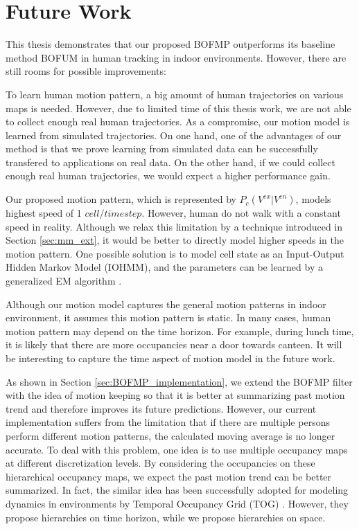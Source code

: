 \section{Future Work}

This thesis demonstrates that our proposed BOFMP outperforms its baseline method BOFUM in human tracking in indoor environments. However, there are still rooms for possible improvements:
\begin{my_enumerate}
\item To learn human motion pattern, a big amount of human trajectories on various maps is needed. However, due to limited time of this thesis work, we are not able to collect enough real human trajectories. As a compromise, our motion model is learned from simulated trajectories. On one hand, one of the advantages of our method is that we prove learning from simulated data can be successfully transfered to applications on real data. On the other hand, if we could collect enough real human trajectories, we would expect a higher performance gain. 
\item Our proposed motion pattern, which is represented by $P_c(V^{ex}|V^{en})$, models highest speed of 1 $cell/timestep$. However, human do not walk with a constant speed in reality. Although we relax this limitation by a technique introduced in Section \ref{sec:mm_ext}, it would be better to directly model higher speeds in the motion pattern. One possible solution is to model cell state as an Input-Output Hidden Markov Model (IOHMM), and the parameters can be learned by a generalized EM algorithm \cite{wang2014modeling}.
\item Although our motion model captures the general motion patterns in indoor environment, it assumes this motion pattern is static. In many cases, human motion pattern may depend on the time horizon. For example, during lunch time, it is likely that there are more occupancies near a door towards canteen. It will be interesting to capture the time aspect of motion model in the future work.
\item As shown in Section \ref{sec:BOFMP_implementation}, we extend the BOFMP filter with the idea of motion keeping so that it is better at summarizing past motion trend and therefore improves its future predictions. However, our current implementation suffers from the limitation that if there are multiple persons perform different motion patterns, the calculated moving average is no longer accurate. To deal with this problem, one idea is to use multiple occupancy maps at different discretization levels. By considering the occupancies on these hierarchical occupancy maps, we expect the past motion trend can be better summarized. In fact, the similar idea has been successfully adopted for modeling dynamics in environments by Temporal Occupancy Grid (TOG) \cite{arbuckle2002temporal}. However, they propose hierarchies on time horizon, while we propose hierarchies on space.
\end{my_enumerate}
